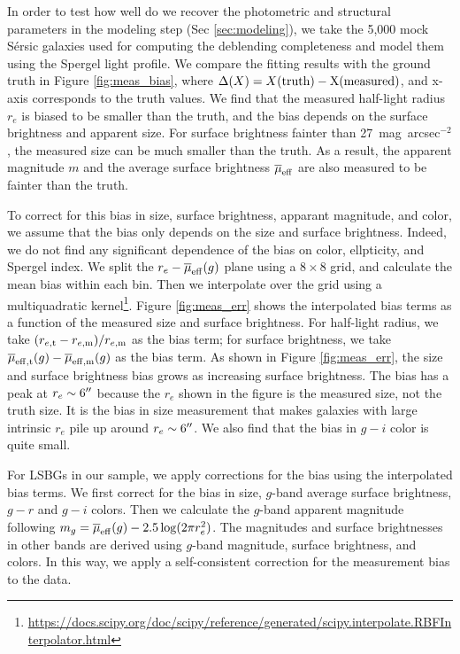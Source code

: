 \documentclass[twocolumn,astrosymb,twocolappendix]{aastex631}
\newcommand{\sbunit}{mag~arcsec$^{-2}$}
\newcommand{\sersic}{S\'ersic}
\begin{document}
\begin{CJK*}{UTF8}{gbsn}
In order to test how well do we recover the photometric and structural parameters in the modeling step (Sec \ref{sec:modeling}), we take the 5,000 mock \sersic{} galaxies used for computing the deblending completeness and model them using the Spergel light profile. We compare the fitting results with the ground truth in Figure \ref{fig:meas_bias}, where $\Delta(X) = X(\rm truth) - X(\rm measured)$, and x-axis corresponds to the truth values. We find that the measured half-light radius $r_e$ is biased to be smaller than the truth, and the bias depends on the surface brightness and apparent size. For surface brightness fainter than 27\ \sbunit, the measured size can be much smaller than the truth. As a result, the apparent magnitude $m$ and the average surface brightness $\overline{\mu}_{\rm eff}$ are also measured to be fainter than the truth. 

To correct for this bias in size, surface brightness, apparant magnitude, and color, we assume that the bias only depends on the size and surface brightness. Indeed, we do not find any significant dependence of the bias on color, ellpticity, and Spergel index. We split the $r_e-\overline{\mu}_{\rm eff}(g)$ plane using a $8\times 8$ grid, and calculate the mean bias within each bin. Then we interpolate over the grid using a multiquadratic kernel\footnote{\url{https://docs.scipy.org/doc/scipy/reference/generated/scipy.interpolate.RBFInterpolator.html}}. Figure \ref{fig:meas_err} shows the interpolated bias terms as a function of the measured size and surface brightness. For half-light radius, we take $(r_{e, \rm t} - r_{e, \rm m}) / r_{e,\rm m}$ as the bias term; for surface brightness, we take $\overline{\mu}_{\rm eff, t}(g) - \overline{\mu}_{\rm eff, m}(g)$ as the bias term. As shown in Figure \ref{fig:meas_err}, the size and surface brightness bias grows as increasing surface brightness. The bias has a peak at $r_e\sim 6\mbox{$^{\prime\prime}$}$ because the $r_e$ shown in the figure is the measured size, not the truth size. It is the bias in size measurement that makes galaxies with large intrinsic $r_e$ pile up around $r_e\sim 6\mbox{$^{\prime\prime}$}$. We also find that the bias in $g-i$ color is quite small. 

For LSBGs in our sample, we apply corrections for the bias using the interpolated bias terms. We first correct for the bias in size, $g$-band average surface brightness, $g-r$ and $g-i$ colors. Then we calculate the $g$-band apparent magnitude following $m_g = \overline{\mu}_{\rm eff}(g) - 2.5\log(2\pi r_e^2)$. The magnitudes and surface brightnesses in other bands are derived using $g$-band magnitude, surface brightness, and colors. In this way, we apply a self-consistent correction for the measurement bias to the data. 


\end{CJK*}
\end{document}
